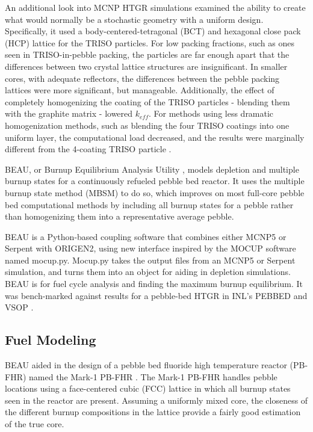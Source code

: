 An additional look into MCNP HTGR simulations examined the ability to create what would normally be a stochastic geometry with a uniform design.  Specifically, it used a body-centered-tetragonal (BCT) and hexagonal close pack (HCP) lattice for the TRISO particles.  For low packing fractions, such as ones seen in TRISO-in-pebble packing, the particles are far enough apart that the differences between two crystal lattice structures are insignificant.  In smaller cores, with adequate reflectors, the differences between the pebble packing lattices were more significant, but manageable.  Additionally, the effect of completely homogenizing the coating of the TRISO particles - blending them with the graphite matrix - lowered $k_{eff}$.  For methods using less dramatic homogenization methods, such as blending the four TRISO coatings into one uniform layer, the computational load decreased, and the results were marginally different from the 4-coating TRISO particle \cite{karriem_mcnp_2001}.

BEAU, or Burnup Equilibrium Analysis Utility \cite{cisneros_pebble_2013}, models depletion and multiple burnup states for a continuously refueled pebble bed reactor. It uses the multiple burnup state method (MBSM) to do so, which improves on most full-core pebble bed computational methods by including all burnup states for a pebble rather than homogenizing them into a representative average pebble.

BEAU is a Python-based coupling software that combines either MCNP5 or Serpent with ORIGEN2, using new interface inspired by the MOCUP software named mocup.py.  Mocup.py takes the output files from an MCNP5 or Serpent simulation, and turns them into an object for aiding in depletion simulations.  BEAU is for fuel cycle analysis and finding the maximum burnup equilibrium.  It was bench-marked against results for a pebble-bed HTGR in INL's PEBBED and VSOP \cite{cisneros_pebble_2013}.

\subsection{Fuel Modeling}

BEAU aided in the design of a pebble bed fluoride high temperature reactor (PB-FHR) named the Mark-1 PB-FHR \cite{cisneros_pebble_2013}.  The Mark-1 PB-FHR handles pebble locations using a face-centered cubic (FCC) lattice in which all burnup states seen in the reactor are present.  Assuming a uniformly mixed core, the closeness of the different burnup compositions in the lattice provide a fairly good estimation of the true core.

